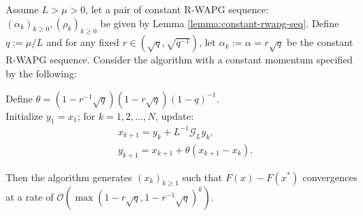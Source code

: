 \documentclass[12pt]{article}
\begin{document}
    \begin{theorem}\label{thm:fixed-momentum-fista}
        Assume $L > \mu > 0$, let a pair of constant R-WAPG sequence: $(\alpha_k)_{k \ge0}, (\rho_k)_{k \ge 0}$ be given by Lemma \ref{lemma:constant-rwapg-seq}.
        Define $q := \mu/L$ and for any fixed $r \in \left(\sqrt{q}, \sqrt{q^{-1}}\right)$, let $\alpha_k := \alpha = r \sqrt{q}$ be the constant R-WAPG sequence. 
        Consider the algorithm with a constant momentum specified by the following: 
        \begin{tcolorbox}
            Define $\theta = \left(1 - r^{-1}\sqrt{q}\right)(1 - r\sqrt{q})(1 - q)^{-1}$. 
            \\
            Initialize $y_1 = x_1$; for $k = 1, 2, \ldots, N$, update: 
            \begin{align*}
                &x_{k + 1} = y_k + L^{-1}\mathcal G_L y_k, 
                \\
                & y_{k + 1} = x_{k + 1} + \theta(x_{k + 1} - x_k). 
            \end{align*}
        \end{tcolorbox}
        Then the algorithm generates $(x_k)_{k \ge 1}$ such that $F(x) - F(x^*)$ convergences at a rate of $\mathcal O\left(\max(1 - r\sqrt{q}, 1 - r^{-1}\sqrt{q})^k\right)$. 
    \end{theorem}
\end{document}

